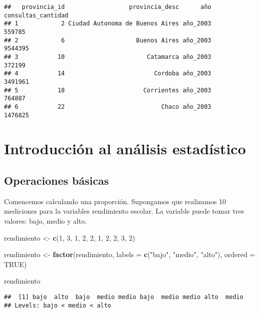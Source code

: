 \documentclass[spanish,]{book}
\newenvironment{Shaded}{\begin{snugshade}}{\end{snugshade}}
\newcommand{\KeywordTok}[1]{\textcolor[rgb]{0.13,0.29,0.53}{\textbf{#1}}}
\newcommand{\DataTypeTok}[1]{\textcolor[rgb]{0.13,0.29,0.53}{#1}}
\newcommand{\DecValTok}[1]{\textcolor[rgb]{0.00,0.00,0.81}{#1}}
\newcommand{\StringTok}[1]{\textcolor[rgb]{0.31,0.60,0.02}{#1}}
\newcommand{\OtherTok}[1]{\textcolor[rgb]{0.56,0.35,0.01}{#1}}
\newcommand{\NormalTok}[1]{#1}
\begin{document}
\begin{verbatim}
##   provincia_id                  provincia_desc      año consultas_cantidad
## 1            2 Ciudad Autonoma de Buenos Aires año_2003             559785
## 2            6                    Buenos Aires año_2003            9544395
## 3           10                       Catamarca año_2003             372199
## 4           14                         Cordoba año_2003            3491961
## 5           18                      Corrientes año_2003             764887
## 6           22                           Chaco año_2003            1476825
\end{verbatim}

\part{Introducción al análisis
estadístico}\label{part-introduccion-al-analisis-estadistico}

\chapter{Operaciones básicas}\label{operaciones-basicas}

Comencemos calculando una proporción. Supongamos que realizamos 10
mediciones para la variables rendimiento escolar. La variable puede
tomar tres valores: bajo, medio y alto.

\begin{Shaded}
\begin{Highlighting}[]
\NormalTok{rendimiento <-}\StringTok{ }\KeywordTok{c}\NormalTok{(}\DecValTok{1}\NormalTok{, }\DecValTok{3}\NormalTok{, }\DecValTok{1}\NormalTok{, }\DecValTok{2}\NormalTok{, }\DecValTok{2}\NormalTok{, }\DecValTok{1}\NormalTok{, }\DecValTok{2}\NormalTok{, }\DecValTok{2}\NormalTok{, }\DecValTok{3}\NormalTok{, }\DecValTok{2}\NormalTok{)}

\NormalTok{rendimiento <-}\StringTok{ }\KeywordTok{factor}\NormalTok{(rendimiento,}
                      \DataTypeTok{labels =} \KeywordTok{c}\NormalTok{(}\StringTok{"bajo"}\NormalTok{, }\StringTok{"medio"}\NormalTok{, }\StringTok{"alto"}\NormalTok{),}
                      \DataTypeTok{ordered =} \OtherTok{TRUE}\NormalTok{)}

\NormalTok{rendimiento}
\end{Highlighting}
\end{Shaded}

\begin{verbatim}
##  [1] bajo  alto  bajo  medio medio bajo  medio medio alto  medio
## Levels: bajo < medio < alto
\end{verbatim}


\end{document}
